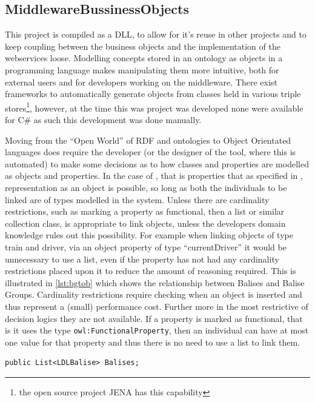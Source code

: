 \subsection{MiddlewareBussinessObjects}

This project is compiled as a DLL, to allow for it's reuse in other projects and to keep coupling between the business objects and the implementation of the webservices loose. Modelling concepts stored in an ontology as objects in a programming language makes manipulating them more intuitive, both for external users and for developers working on the middleware. There exist frameworks to automatically generate objects from classes held in various triple stores\footnote{the open source project JENA has this capability}, however, at the time this was project was developed none were available for C\# as such this development was done manually.

 Moving from the ``Open World'' of RDF and ontologies to Object Orientated languages does require the developer (or the designer of the tool, where this is automated) to make some decisions as to how classes and properties are modelled as objects and properties. In the case of , that is properties that  as specified in \citet{McGuinness04}, representation as an object is possible, so long as both the individuals to be linked are of types modelled in the system. Unless there are cardinality restrictions, such as marking a property as functional, then a list or similar collection class, is appropriate to link objects, unless the developers domain knowledge rules out this possibility. For example when linking objects of type train and driver, via an object property of type ``currentDriver'' it would be unnecessary to use a list, even if the property has not had any cardinality restrictions placed upon it to reduce the amount of reasoning required. This is illustrated in \autoref{lst:bgtob} which shows the relationship between Balises and Balise Groups. Cardinality restrictions require checking when an object is inserted and thus represent a (small) performance cost. Further more in the most restrictive of decision logics they are not available. If a property is marked as functional, that is it uses the type \texttt{owl:FunctionalProperty}, then an individual can have at most one value for that property and thus there is no need to use a list to link them.

\begin{lstlisting}[language={[Sharp]C},frame=tb,caption={Linking of Balises to BaliseGroups},label=lst:bgtob]
   public List<LDLBalise> Balises;
\end{lstlisting}

